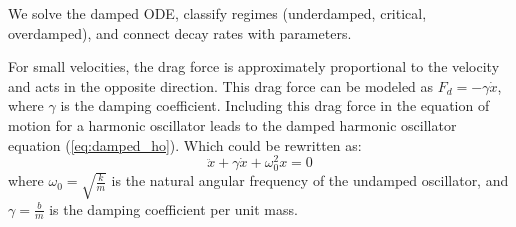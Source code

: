 \documentclass[11pt]{report}
\begin{document}
We solve the damped ODE, classify regimes (underdamped, critical, overdamped), and connect decay rates with parameters.
\begin{definition}
    For small velocities, the drag force is approximately proportional to the velocity and acts in the opposite direction. This drag force can be modeled as \( F_d = -\gamma \dot{x} \), where \( \gamma \) is the damping coefficient. Including this drag force in the equation of motion for a harmonic oscillator leads to the damped harmonic oscillator equation (\ref{eq:damped_ho}). Which could be rewritten as:
    $$
        \ddot{x} + \gamma \dot{x} + \omega_0^2 x = 0
    $$
    where \( \omega_0 = \sqrt{\frac{k}{m}} \) is the natural angular frequency of the undamped oscillator, and \( \gamma = \frac{b}{m} \) is the damping coefficient per unit mass.
    

\end{definition}
\end{document}
